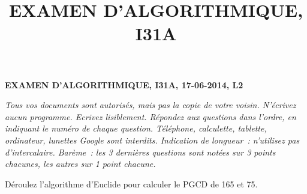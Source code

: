 \documentclass[11pt]{article}
\begin{document}
\title{EXAMEN D'ALGORITHMIQUE, I31A}
\date{}%
{\bf\large EXAMEN D'ALGORITHMIQUE, I31A, 17-06-2014, L2} 

\medskip

{\it Tous vos documents sont autorisés, mais pas la copie de votre voisin.
N'écrivez aucun programme.
Ecrivez lisiblement.
Répondez aux questions dans l'ordre, en indiquant le numéro de chaque question.
Téléphone, calculette, tablette, ordinateur, lunettes Google sont interdits. 
Indication de longueur~: n'utilisez pas d'intercalaire.
Barème~: les 3 dernières questions sont notées sur 3 points chacunes, les autres sur 1 point chacune.
}

\newcommand\q[1]{\smallskip \noindent {\bf #1.}}
\medskip 

\q{1}  {D\'eroulez l'algorithme d'Euclide pour calculer le PGCD de 165 et 75}.
~
\end{document}

